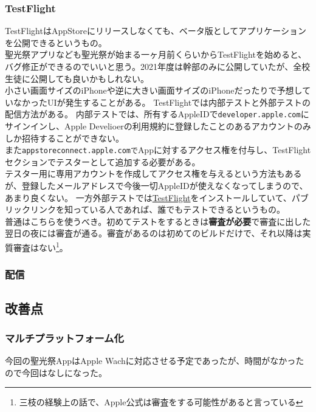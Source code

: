 \documentclass[a4paper]{ltjsreport}
\newcommand{\impact}[1]{\textbf{\gtfamily #1}}
\newcommand{\link}[2]{\href{#2}{#1}}
\begin{document}
\subsubsection{TestFlight}\label{sec:TestFlight}
TestFlightはAppStoreにリリースしなくても、ベータ版としてアプリケーションを公開できるというもの。\\
聖光祭アプリなども聖光祭が始まる一ヶ月前くらいからTestFlightを始めると、バグ修正ができるのでいいと思う。2021年度は幹部のみに公開していたが、全校生徒に公開しても良いかもしれない。\\
小さい画面サイズのiPhoneや逆に大きい画面サイズのiPhoneだったりで予想していなかったUIが発生することがある。
TestFlightでは内部テストと外部テストの配信方法がある。
内部テストでは、所有するAppleIDで\texttt{developer.apple.com}にサインインし、Apple Develioerの利用規約に登録したことのあるアカウントのみしか招待することができない。\\
また\texttt{appstoreconnect.apple.comで}Appに対するアクセス権を付与し、TestFlightセクションでテスターとして追加する必要がある。\\
テスター用に専用アカウントを作成してアクセス権を与えるという方法もあるが、登録したメールアドレスで今後一切AppleIDが使えなくなってしまうので、あまり良くない。
一方外部テストでは\link{TestFlight}{https://itunes.apple.com/jp/app/testflight/id899247664?mt=8}をインストールしていて、パブリックリンクを知っている人であれば、誰でもテストできるというもの。\\
普通はこちらを使うべき。初めてテストをするときは\impact{審査が必要}で審査に出した翌日の夜には審査が通る。審査があるのは初めてのビルドだけで、それ以降は実質審査はない\footnote{三枝の経験上の話で、Apple公式は審査をする可能性があると言っている}。\\
\subsubsection{配信}
\subsection{改善点}
\subsubsection{マルチプラットフォーム化}
今回の聖光祭AppはApple Wachに対応させる予定であったが、時間がなかったので今回はなしになった。
\end{document}
